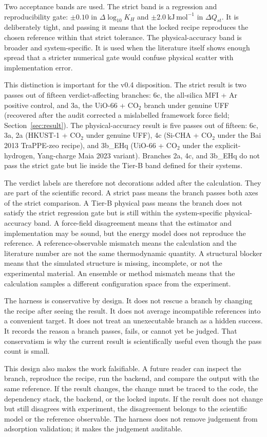 Two acceptance bands are used. The strict band is a regression and reproducibility gate: \(\pm 0.10\) in \(\Delta \log_{10} K_H\) and \(\pm 2.0\ \mathrm{kJ\,mol^{-1}}\) in \(\Delta Q_{st}\). It is deliberately tight, and passing it means that the locked recipe reproduces the chosen reference within that strict tolerance. The physical-accuracy band is broader and system-specific. It is used when the literature itself shows enough spread that a stricter numerical gate would confuse physical scatter with implementation error.

This distinction is important for the v0.4 disposition. The strict result is two passes out of fifteen verdict-affecting branches: 6c, the all-silica MFI + Ar positive control, and 3a, the UiO-66 + CO\(_2\) branch under genuine UFF (recovered after the audit corrected a mislabelled framework force field; Section~\ref{sec:result}). The physical-accuracy result is five passes out of fifteen: 6c, 3a, 2a (HKUST-1 + CO\(_2\) under genuine UFF), 4c (Si-CHA + CO\(_2\) under the Bai 2013 TraPPE-zeo recipe), and 3b\_EHq (UiO-66 + CO\(_2\) under the explicit-hydrogen, Yang-charge Maia 2023 variant). Branches 2a, 4c, and 3b\_EHq do not pass the strict gate but lie inside the Tier-B band defined for their systems.

The verdict labels are therefore not decorations added after the calculation. They are part of the scientific record. A strict pass means the branch passes both axes of the strict comparison. A Tier-B physical pass means the branch does not satisfy the strict regression gate but is still within the system-specific physical-accuracy band. A force-field disagreement means that the estimator and implementation may be sound, but the energy model does not reproduce the reference. A reference-observable mismatch means the calculation and the literature number are not the same thermodynamic quantity. A structural blocker means that the simulated structure is missing, incomplete, or not the experimental material. An ensemble or method mismatch means that the calculation samples a different configuration space from the experiment.

The harness is conservative by design. It does not rescue a branch by changing the recipe after seeing the result. It does not average incompatible references into a convenient target. It does not treat an unexecutable branch as a hidden success. It records the reason a branch passes, fails, or cannot yet be judged. That conservatism is why the current result is scientifically useful even though the pass count is small.

This design also makes the work falsifiable. A future reader can inspect the branch, reproduce the recipe, run the backend, and compare the output with the same reference. If the result changes, the change must be traced to the code, the dependency stack, the backend, or the locked inputs. If the result does not change but still disagrees with experiment, the disagreement belongs to the scientific model or the reference observable. The harness does not remove judgement from adsorption validation; it makes the judgement auditable.
